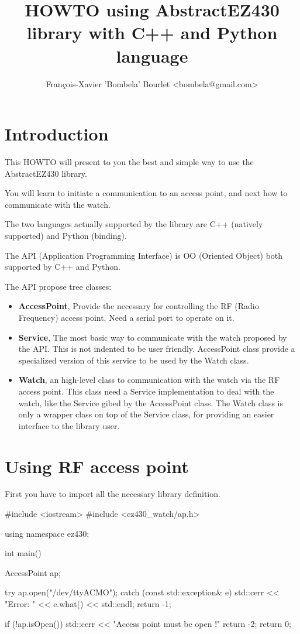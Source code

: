 \documentclass[11pt,a4paper]{article}
\title{HOWTO using AbstractEZ430 library with C++ and Python language}
\author{François-Xavier 'Bombela' Bourlet <bombela@gmail.com>}
\begin{document}
\maketitle
\newpage

\tableofcontents
\newpage

\section{Introduction}

This HOWTO will present to you the best and simple way
to use the AbstractEZ430 library.

You will learn to initiate a communication to an access point,
and next how to communicate with the watch.

The two languages actually supported by the library
are C++ (natively supported) and Python (binding).

The API (Application Programming Interface) is OO (Oriented Object)
both supported by C++ and Python.

The API propose tree classes:
\begin{itemize}
	\item \textbf{AccessPoint},
			Provide the necessary for controlling the RF (Radio Frequency) access point.
			Need a serial port to operate on it.
	\item \textbf{Service},
			The most basic way to communicate with the watch proposed
			by the API. This is not indented to be user friendly.
			AccessPoint class provide a specialized version of this service
			to be used by the Watch class.
	\item \textbf{Watch},
			an high-level class to communication with the watch via the RF access point.
			This class need a Service implementation to deal with the watch,
			like the Service gibed by the AccessPoint class.
			The Watch class is only a wrapper class on top of the Service class,
			for providing an easier interface to the library user.
\end{itemize}

\break

\section{Using RF access point}

First you have to import all the necessary library definition.

\begin{C++}
#include <iostream>
#include <ez430_watch/ap.h>

using namespace ez430;

int main()
{
	AccessPoint ap;

	try {
		ap.open("/dev/ttyACMO");
	}
	catch (const std::exception& e) {
		std::cerr << "Error: " << e.what() << std::endl;
		return -1;
	}

	if (!ap.isOpen()) {
		std::cerr << "Access point must be open !"
		return -2;
	}
	return 0;
}
\end{C++}
\end{document}
